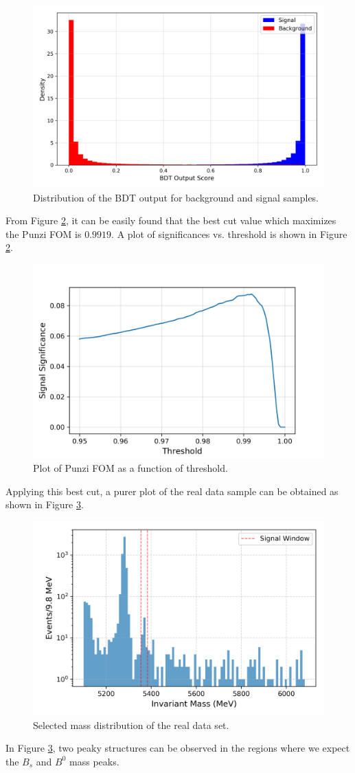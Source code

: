     \begin{figure}[H]
        \centering
        \includegraphics[width=0.7\linewidth]{Figure/6_BDT_Score.png}
        \caption{Distribution of the BDT output for background and signal samples.}
        \label{dist}
    \end{figure}

    From Figure \ref{sig_vs_thres}, it can be easily found that the best cut value which maximizes the Punzi FOM is $0.9919$. A plot of significances vs. threshold is shown in Figure \ref{sig_vs_thres}.

    \begin{figure}[H]
        \centering
        \includegraphics[width=0.5\linewidth]{Figure/7_significance_vs_threshold.png}
        \caption{Plot of Punzi FOM as a function of threshold.}
        \label{sig_vs_thres}
    \end{figure}
    Applying this best cut, a purer plot of the real data sample can be obtained as shown in Figure \ref{last_inv}.\\
    \begin{figure}[H]
        \centering
        \includegraphics[width=0.5\linewidth]{Figure/8_data_invariant_mass_distribution.png}
        \caption{Selected mass distribution of the real data set.}
        \label{last_inv}
    \end{figure}
    In Figure \ref{last_inv}, two peaky structures can be observed in the regions where we expect the  $B_{s}$ and $B^{0}$ mass peaks.

